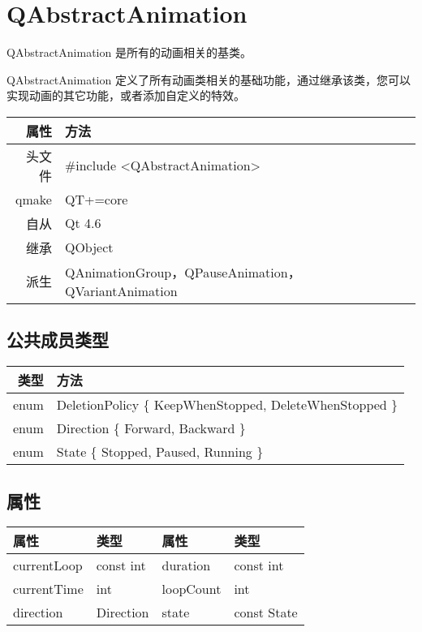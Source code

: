 \chapter{QAbstractAnimation}

QAbstractAnimation 是所有的动画相关的基类。

QAbstractAnimation 定义了所有动画类相关的基础功能，通过继承该类，您可以实现动画的其它功能，或者添加自定义的特效。

\begin{tabular}{|r|l|}
	\hline
	属性 & 方法 \\
	\hline
	头文件 & \#include <QAbstractAnimation>\\      
	\hline
	qmake & QT+=core\\      
	\hline
	自从 & Qt 4.6\\
	\hline
	继承&QObject \\
	\hline
	派生 & QAnimationGroup，QPauseAnimation，QVariantAnimation \\
	\hline
\end{tabular}

\section{公共成员类型}

\begin{tabular}{|r|l|}
	\hline
	类型 & 方法 \\
	\hline
	enum & DeletionPolicy \{ KeepWhenStopped, DeleteWhenStopped \}\\      
	\hline
	enum & Direction \{ Forward, Backward \}\\      
	\hline
	enum & State \{ Stopped, Paused, Running \}\\
	\hline
\end{tabular}

\section{属性}

\begin{tabular}{|l|l|l|l|}
	\hline
	属性 & 类型 &属性 &类型 \\
	\hline
		currentLoop & const int &duration &const int \\
	\hline
	currentTime	&int&	loopCount&	int\\
	\hline
	direction	&Direction	&state&	const State\\
	\hline
\end{tabular}



